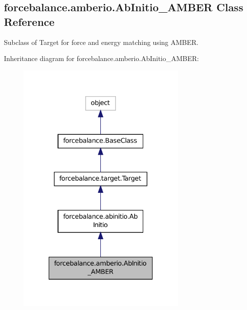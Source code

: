 \hypertarget{classforcebalance_1_1amberio_1_1AbInitio__AMBER}{\subsection{forcebalance.\-amberio.\-Ab\-Initio\-\_\-\-A\-M\-B\-E\-R Class Reference}
\label{classforcebalance_1_1amberio_1_1AbInitio__AMBER}
}


Subclass of Target for force and energy matching using A\-M\-B\-E\-R.  




Inheritance diagram for forcebalance.\-amberio.\-Ab\-Initio\-\_\-\-A\-M\-B\-E\-R\-:
\nopagebreak
\begin{figure}[H]
\begin{center}
\leavevmode
\includegraphics[width=238pt]{classforcebalance_1_1amberio_1_1AbInitio__AMBER__inherit__graph}
\end{center}
\end{figure}


